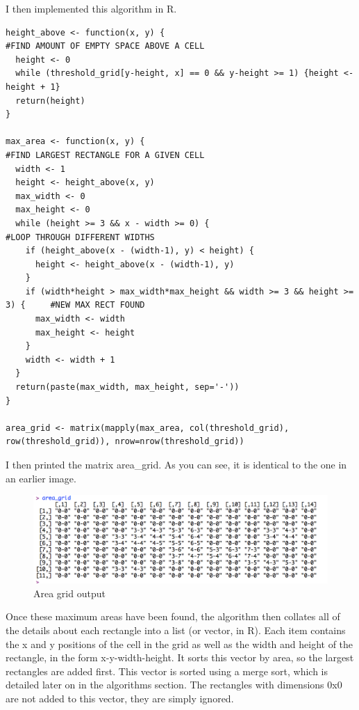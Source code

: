 \documentclass[titlepage]{article}
\begin{document}
I then implemented this algorithm in R. 

\begin{changemargin}{-1in}{-1in} 
\begin{verbatim}
height_above <- function(x, y) {                                                #FIND AMOUNT OF EMPTY SPACE ABOVE A CELL
  height <- 0
  while (threshold_grid[y-height, x] == 0 && y-height >= 1) {height <- height + 1}
  return(height)
}

max_area <- function(x, y) {                                                    #FIND LARGEST RECTANGLE FOR A GIVEN CELL
  width <- 1
  height <- height_above(x, y)
  max_width <- 0
  max_height <- 0
  while (height >= 3 && x - width >= 0) {                                       #LOOP THROUGH DIFFERENT WIDTHS
    if (height_above(x - (width-1), y) < height) {
      height <- height_above(x - (width-1), y)
    }
    if (width*height > max_width*max_height && width >= 3 && height >= 3) {     #NEW MAX RECT FOUND
      max_width <- width
      max_height <- height
    }
    width <- width + 1
  }
  return(paste(max_width, max_height, sep='-'))
}

area_grid <- matrix(mapply(max_area, col(threshold_grid), row(threshold_grid)), nrow=nrow(threshold_grid))
\end{verbatim}
\end{changemargin} 

I then printed the matrix area\_grid. As you can see, it is identical to the one in an earlier image.

\begin{figure}[H]
  \centering
  \includegraphics[width=12cm]{areaoutput.png}
  \caption{Area grid output}
  \label{fig:dijk}
\end{figure}

Once these maximum areas have been found, the algorithm then collates all of the details about each rectangle into a list (or vector, in R). Each item contains the x and y positions of the cell in the grid as well as the width and height of the rectangle, in the form x-y-width-height. It sorts this vector by area, so the largest rectangles are added first. This vector is sorted using a merge sort, which is detailed later on in the algorithms section. The rectangles with dimensions 0x0 are not added to this vector, they are simply ignored. 
\end{document}
